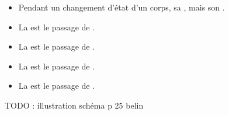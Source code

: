 \begin{mybilan}
	\begin{itemize}
		\item Pendant un changement d'état d'un corps, sa , mais son .
		\item La  est le passage de .
		\item La  est le passage de .
		\item La  est le passage de .
		\item La  est le passage de .
		
	\end{itemize}

	TODO : illustration schéma p 25 belin 
\end{mybilan}